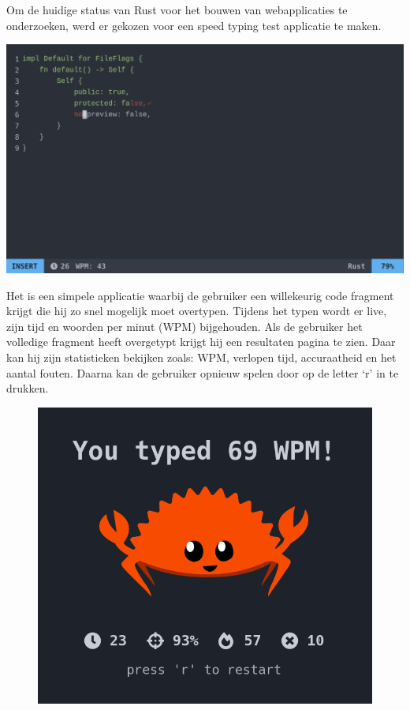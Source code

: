 Om de huidige status van Rust voor het bouwen van webapplicaties te onderzoeken, werd er gekozen
voor een speed typing test applicatie te maken.

\includegraphics[width=\textwidth]{./figures/vim.png}

Het is een simpele applicatie waarbij de gebruiker een willekeurig code fragment krijgt die hij zo
snel mogelijk moet overtypen. Tijdens het typen wordt er live, zijn tijd en woorden per minut (WPM)
bijgehouden. Als de gebruiker het volledige fragment heeft overgetypt krijgt hij een resultaten
pagina te zien. Daar kan hij zijn statistieken bekijken zoals: WPM, verlopen tijd, accuraatheid en
het aantal fouten. Daarna kan de gebruiker opnieuw spelen door op de letter ‘r’ in te drukken. \\
\begin{figure}
  \centering
  \includegraphics[width=0.9\linewidth]{./figures/result.png}
\end{figure}


